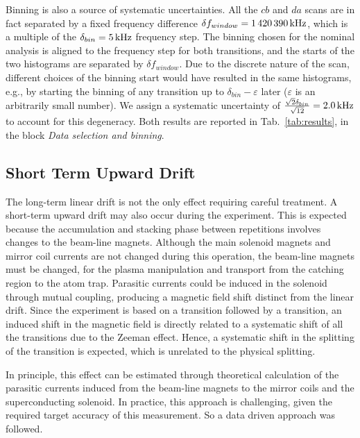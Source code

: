 Binning is also a source of systematic uncertainties. All the $cb$ and $da$ scans are in fact separated by a fixed frequency difference $\delta f_{window} = 1\,420\,390\,{\rm kHz}$, which is a multiple of the $\delta_{bin} = 5\,{\rm kHz}$ frequency step. The binning chosen for the nominal analysis is aligned to the frequency step for both transitions, and the starts of the two histograms are separated by  $\delta f_{window}$. Due to the discrete nature of the scan, different choices of the binning start would have resulted in the same histograms, e.g., by starting the binning of any transition up to $\delta_{bin} -\varepsilon$ later ($\varepsilon$ is an arbitrarily small number). We assign a systematic uncertainty of $\frac{\sqrt{2}\delta_{bin}}{\sqrt{12}} = 2.0\,{\rm kHz}$ to account for this degeneracy. Both results are reported in Tab.~\ref{tab:results}, in the block \textit{Data selection and binning}.


\subsection{Short Term Upward Drift} \label{sec:ShortDrift}

The long-term linear drift is not the only effect requiring careful treatment. A short-term upward drift may also occur during the experiment. This is expected because the accumulation and stacking phase between repetitions involves changes to the beam-line magnets. Although the main solenoid magnets and mirror coil currents are not changed during this operation, the beam-line magnets must be changed, for the plasma manipulation and transport from the catching region to the atom trap. Parasitic currents could be induced in the solenoid through mutual coupling, producing a magnetic field shift distinct from the linear drift. Since the experiment is based on a \cb transition followed by a \da transition, an induced shift in the magnetic field is directly related to a systematic shift of all the \da transitions due to the Zeeman effect. Hence, a systematic shift in the splitting of the transition is expected, which is unrelated to the physical splitting.

In principle, this effect can be estimated through theoretical calculation of the parasitic currents induced from the beam-line magnets to the mirror coils and the superconducting solenoid. In practice, this approach is challenging, given the required target accuracy of this measurement. So a data driven approach was followed.

